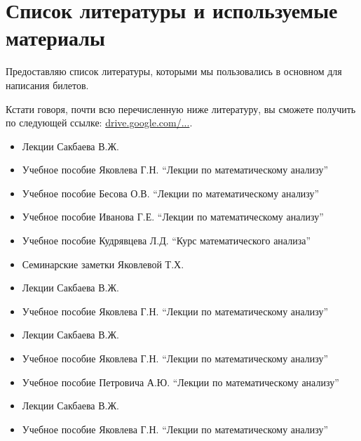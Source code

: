 \chapter{Список литературы и используемые материалы}

Предоставляю список литературы, которыми мы пользовались в основном для написания билетов. 

Кстати говоря, почти всю перечисленную ниже литературу, вы сможете получить по следующей ссылке: \href{https://drive.google.com/drive/u/0/folders/0BzuzEyNkpwYDcENXcV9jNWdwVlU}{drive.google.com/...}.


\begin{itemize}[wide,  labelwidth=!, noitemsep, label=$\blacktriangleright$, labelindent = 0pt]
\item
Лекции Сакбаева В.Ж.
\item
Учебное пособие Яковлева Г.Н. ``Лекции по математическому анализу'' 
\item
Учебное пособие Бесова О.В. ``Лекции по математическому анализу''
\item
Учебное пособие Иванова Г.Е. ``Лекции по математическому анализу'' 
\item 
Учебное пособие Кудрявцева Л.Д. ``Курс математического анализа''
\item
Семинарские заметки Яковлевой Т.Х.
\end{itemize}

\begin{itemize}[wide,  labelwidth=!, noitemsep, label=$\blacktriangleright$, labelindent = 0pt]
\item
Лекции Сакбаева В.Ж.
\item
Учебное пособие Яковлева Г.Н. ``Лекции по математическому анализу'' 
\end{itemize}

\begin{itemize}[wide,  labelwidth=!, noitemsep, label=$\blacktriangleright$, labelindent = 0pt]
\item
Лекции Сакбаева В.Ж.
\item
Учебное пособие Яковлева Г.Н. ``Лекции по математическому анализу'' 
\item
Учебное пособие Петровича А.Ю. ``Лекции по математическому анализу'' 
\end{itemize}

\begin{itemize}[wide,  labelwidth=!, noitemsep, label=$\blacktriangleright$, labelindent = 0pt]
\item
Лекции Сакбаева В.Ж.
\item
Учебное пособие Яковлева Г.Н. ``Лекции по математическому анализу''
\end{itemize}

